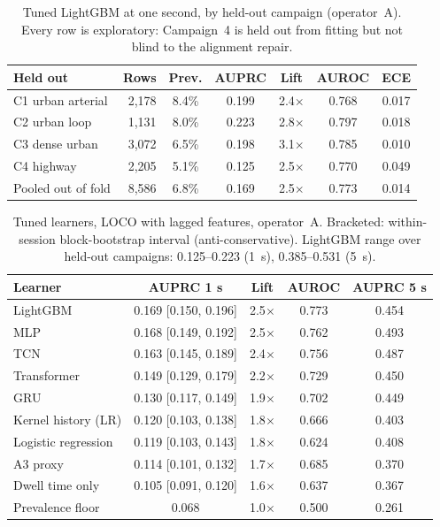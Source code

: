 \documentclass[preprint,review,12pt]{elsarticle}\usepackage{lineno}\linenumbers
\newcommand{\x}{$\times$}
\begin{document}
\begin{table}[t]
\centering
\caption{Tuned LightGBM at one second, by held-out campaign (operator~A). Every row is exploratory: Campaign~4 is held out from fitting but not blind to the alignment repair.}
\label{tab:percamp}
\footnotesize
\setlength{\tabcolsep}{3pt}
\begin{tabularx}{\linewidth}{X r c c c c c}
\toprule
\textbf{Held out} & \textbf{Rows} & \textbf{Prev.} & \textbf{AUPRC} & \textbf{Lift} & \textbf{AUROC} & \textbf{ECE} \\
\midrule
C1 urban arterial & 2,178 & 8.4\% & 0.199 & 2.4\x & 0.768 & 0.017 \\
C2 urban loop & 1,131 & 8.0\% & 0.223 & 2.8\x & 0.797 & 0.018 \\
C3 dense urban & 3,072 & 6.5\% & 0.198 & 3.1\x & 0.785 & 0.010 \\
C4 highway & 2,205 & 5.1\% & 0.125 & 2.5\x & 0.770 & 0.049 \\
Pooled out of fold & 8,586 & 6.8\% & 0.169 & 2.5\x & 0.773 & 0.014 \\
\bottomrule
\end{tabularx}
\end{table}

\begin{table}[t]
\centering
\caption{Tuned learners, LOCO with lagged features, operator~A. Bracketed: within-session block-bootstrap interval (anti-conservative). LightGBM range over held-out campaigns: 0.125--0.223 (1~s), 0.385--0.531 (5~s).}
\label{tab:level}
\footnotesize
\setlength{\tabcolsep}{2.5pt}
\begin{tabularx}{\linewidth}{X c c c c}
\toprule
\textbf{Learner} & \textbf{AUPRC 1 s} & \textbf{Lift} & \textbf{AUROC} & \textbf{AUPRC 5 s} \\
\midrule
LightGBM & 0.169 [0.150, 0.196] & 2.5\x & 0.773 & 0.454 \\
MLP & 0.168 [0.149, 0.192] & 2.5\x & 0.762 & 0.493 \\
TCN & 0.163 [0.145, 0.189] & 2.4\x & 0.756 & 0.487 \\
Transformer & 0.149 [0.129, 0.179] & 2.2\x & 0.729 & 0.450 \\
GRU & 0.130 [0.117, 0.149] & 1.9\x & 0.702 & 0.449 \\
Kernel history (LR) & 0.120 [0.103, 0.138] & 1.8\x & 0.666 & 0.403 \\
Logistic regression & 0.119 [0.103, 0.143] & 1.8\x & 0.624 & 0.408 \\
A3 proxy & 0.114 [0.101, 0.132] & 1.7\x & 0.685 & 0.370 \\
Dwell time only & 0.105 [0.091, 0.120] & 1.6\x & 0.637 & 0.367 \\
Prevalence floor & 0.068 & 1.0\x & 0.500 & 0.261 \\
\bottomrule
\end{tabularx}
\end{table}
\end{document}
